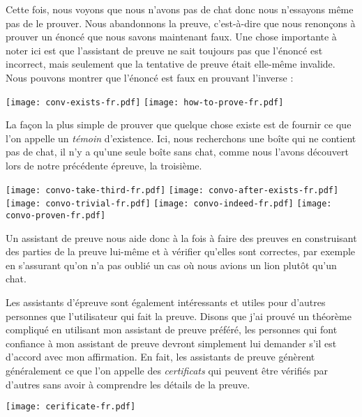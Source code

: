 Cette fois, nous voyons que nous n'avons pas de chat donc nous n'essayons même
pas de le prouver.
Nous abandonnons la preuve, c'est-à-dire que nous renonçons à prouver un
énoncé que nous savons maintenant faux.
Une chose importante à noter ici est que l'assistant de preuve ne sait toujours
pas que l'énoncé est incorrect, mais seulement que la tentative de preuve était elle-même invalide.
Nous pouvons montrer que l'énoncé est faux en prouvant l'inverse :

\begin{center}
  \texttt{[image: conv-exists-fr.pdf]}
  \texttt{[image: how-to-prove-fr.pdf]}
\end{center}

La façon la plus simple de prouver que quelque chose existe est de fournir ce
que l'on appelle un \emph{témoin} d'existence. Ici, nous recherchons une boîte
qui ne contient pas de chat, il n'y a qu'une seule boîte sans chat, comme nous l'avons découvert lors de notre précédente épreuve, la troisième.

\begin{center}
  \texttt{[image: convo-take-third-fr.pdf]}
  \texttt{[image: convo-after-exists-fr.pdf]}
  \texttt{[image: convo-trivial-fr.pdf]}
  \texttt{[image: convo-indeed-fr.pdf]}
  \texttt{[image: convo-proven-fr.pdf]}
\end{center}

Un assistant de preuve nous aide donc à la fois à faire des preuves en
construisant des parties de la preuve lui-même et à vérifier qu'elles sont
correctes, par exemple en s'assurant qu'on n'a pas oublié un cas où nous avions
un lion plutôt qu'un chat.

Les assistants d'épreuve sont également intéressants et utiles pour d'autres
personnes que l'utilisateur qui fait la preuve. Disons que j'ai prouvé un
théorème compliqué en utilisant mon assistant de preuve préféré, les personnes
qui font confiance à mon assistant de preuve devront simplement lui demander
s'il est d'accord avec mon affirmation.
En fait, les assistants de preuve génèrent généralement ce que l'on appelle des
\emph{certificats} qui peuvent être vérifiés par d'autres sans avoir à
comprendre les détails de la preuve.

\begin{center}
  \texttt{[image: cerificate-fr.pdf]}
\end{center}

